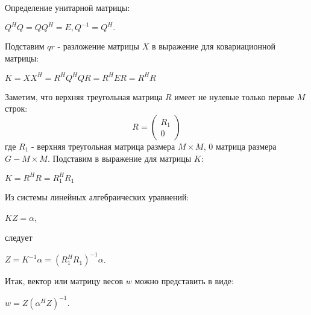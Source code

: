 \documentclass[a4paper,12pt]{report}
\begin{document}
	Определение унитарной матрицы:
	\begin{center}
		$Q^HQ = QQ^H = E, Q^{-1} = Q^H.$
	\end{center}
	Подставим $qr$ - разложение матрицы $X$ в выражение для ковариационной матрицы:
	\begin{center}
		$K = XX^H = R^HQ^HQR = R^HER = R^HR$
	\end{center}
	Заметим, что верхняя треугольная матрица $R$ имеет не нулевые только первые $M$ строк:
	\begin{equation}
		R = \begin{pmatrix} 
			R_{1} \\
			0
		\end{pmatrix}
	\end{equation}
	где $R_{1}$ - верхняя треугольная матрица размера $M \times M$,  $0$ матрица размера $G-M \times M$.
	Подставим в выражение для матрицы $K$:
	\begin{center}
		$K = R^HR = R_{1}^{H}R_{1}$
	\end{center}
	Из системы линейных алгебраических уравнений:
	\begin{center}
		$KZ = \alpha$,
	\end{center}
	следует
	\begin{center}
		$Z = K^{-1}\alpha = (R_{1}^{H}R_{1})^{-1}\alpha$.
	\end{center}
	Итак, вектор или матрицу весов $w$ можно представить в виде:
	\begin{center}
		$w = Z(\alpha^HZ)^{-1}.$
	\end{center}
\end{document}
